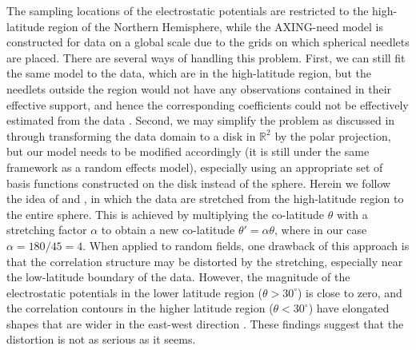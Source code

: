 \documentclass[aoas,preprint]{imsart}
\numberwithin{equation}{section}
\theoremstyle{plain}
\begin{document}
The sampling locations of the electrostatic potentials are restricted to the high-latitude region of the Northern Hemisphere, while the AXING-need model is constructed for data on a global scale due to the grids on which spherical needlets are placed. There are several ways of handling this problem. First, we can still fit the same model to the data, which are in the high-latitude region, but the needlets outside the region would not have any observations contained in their effective support, and hence the corresponding coefficients could not be effectively estimated from the data \citep[Section 3.1]{Chu-09}. Second, we may simplify the problem as discussed in \citet{heaton-15} through transforming the data domain to a disk in $\mathbb{R}^2$ by the polar projection, but our model needs to be modified accordingly (it is still under the same framework as a random effects model), especially using an appropriate set of basis functions constructed on the disk instead of the sphere. Herein we follow the idea of \citet{Weimer-95} and \citet{ruohoniemi-98}, in which the data are stretched from the high-latitude region to the entire sphere. This is achieved by multiplying the co-latitude $\theta$ with a stretching factor $\alpha$ to obtain a new co-latitude $\theta'=\alpha \theta$, where in our case $\alpha=180/45=4$. When applied to random fields, one drawback of this approach is that the correlation structure may be distorted by the stretching, especially near the low-latitude boundary of the data. However, the magnitude of the electrostatic potentials in the lower latitude region ($\theta > 30^\circ$) is close to zero, and the correlation contours in the higher latitude region ($\theta < 30^\circ$) have elongated shapes that are wider in the east-west direction \citep{Cousins-13}. These findings suggest that the distortion is not as serious as it seems.
\end{document}
